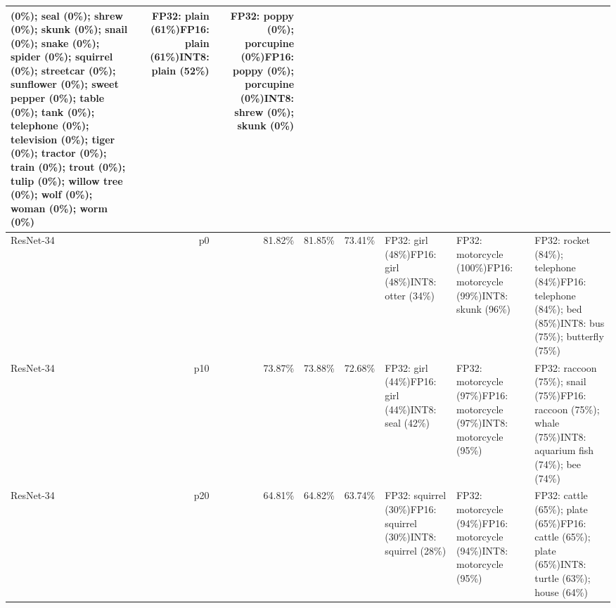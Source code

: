 \begin{longtable}{p{2.8cm} r r r r p{5.0cm} p{4.2cm} p{4.2cm}}
(0\%); seal (0\%); shrew (0\%); skunk (0\%); snail (0\%); snake (0\%); spider (0\%); squirrel (0\%); streetcar (0\%); sunflower (0\%); sweet pepper (0\%); table (0\%); tank (0\%); telephone (0\%); television (0\%); tiger (0\%); tractor (0\%); train (0\%); trout (0\%); tulip (0\%); willow tree (0\%); wolf (0\%); woman (0\%); worm (0\%) & FP32: plain (61\%)\newline FP16: plain (61\%)\newline INT8: plain (52\%) & FP32: poppy (0\%); porcupine (0\%)\newline FP16: poppy (0\%); porcupine (0\%)\newline INT8: shrew (0\%); skunk (0\%) \\ \hline
ResNet-34 & p0 & 81.82\% & 81.85\% & 73.41\% & FP32: girl (48\%)\newline FP16: girl (48\%)\newline INT8: otter (34\%) & FP32: motorcycle (100\%)\newline FP16: motorcycle (99\%)\newline INT8: skunk (96\%) & FP32: rocket (84\%); telephone (84\%)\newline FP16: telephone (84\%); bed (85\%)\newline INT8: bus (75\%); butterfly (75\%) \\ \hline
ResNet-34 & p10 & 73.87\% & 73.88\% & 72.68\% & FP32: girl (44\%)\newline FP16: girl (44\%)\newline INT8: seal (42\%) & FP32: motorcycle (97\%)\newline FP16: motorcycle (97\%)\newline INT8: motorcycle (95\%) & FP32: raccoon (75\%); snail (75\%)\newline FP16: raccoon (75\%); whale (75\%)\newline INT8: aquarium fish (74\%); bee (74\%) \\ \hline
ResNet-34 & p20 & 64.81\% & 64.82\% & 63.74\% & FP32: squirrel (30\%)\newline FP16: squirrel (30\%)\newline INT8: squirrel (28\%) & FP32: motorcycle (94\%)\newline FP16: motorcycle (94\%)\newline INT8: motorcycle (95\%) & FP32: cattle (65\%); plate (65\%)\newline FP16: cattle (65\%); plate (65\%)\newline INT8: turtle (63\%); house (64\%) \\ \hline

\end{longtable}
